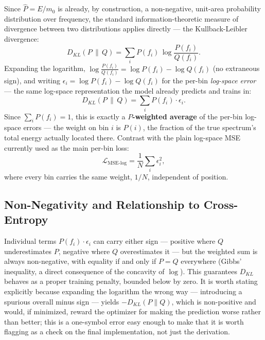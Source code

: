 \documentclass[11pt,a4paper]{article}
\begin{document}
Since $\hat P = E/m_0$ is already, by construction, a non-negative,
unit-area probability distribution over frequency, the standard
information-theoretic measure of divergence between two distributions
applies directly — the Kullback-Leibler divergence:
\begin{equation}
D_{KL}(P\,\|\,Q) = \sum_i P(f_i)\,\log\frac{P(f_i)}{Q(f_i)}.
\end{equation}
Expanding the logarithm, $\log\frac{P(f_i)}{Q(f_i)} = \log P(f_i) - \log
Q(f_i)$ (no extraneous sign), and writing $\epsilon_i = \log P(f_i) - \log
Q(f_i)$ for the per-bin \emph{log-space error} — the same log-space
representation the model already predicts and trains in:
\begin{equation}
D_{KL}(P\,\|\,Q) = \sum_i P(f_i)\cdot \epsilon_i.
\end{equation}
Since $\sum_i P(f_i) = 1$, this is exactly a \textbf{$P$-weighted average}
of the per-bin log-space errors — the weight on bin $i$ is $P(i)$, the
fraction of the true spectrum's total energy actually located there.
Contrast with the plain log-space MSE currently used as the main per-bin
loss:
\begin{equation}
\mathcal{L}_{\text{MSE-log}} = \frac{1}{N}\sum_i \epsilon_i^2,
\end{equation}
where every bin carries the same weight, $1/N$, independent of position.

\subsection{Non-Negativity and Relationship to Cross-Entropy}

Individual terms $P(f_i)\cdot\epsilon_i$ can carry either sign — positive
where $Q$ underestimates $P$, negative where $Q$ overestimates it — but the
weighted sum is always non-negative, with equality if and only if $P=Q$
everywhere (Gibbs' inequality, a direct consequence of the concavity of
$\log$). This guarantees $D_{KL}$ behaves as a proper training penalty,
bounded below by zero. It is worth stating explicitly because expanding the
logarithm the wrong way — introducing a spurious overall minus sign — yields
$-D_{KL}(P\|Q)$, which is non-positive and would, if minimized, reward the
optimizer for making the prediction worse rather than better; this is a
one-symbol error easy enough to make that it is worth flagging as a check
on the final implementation, not just the derivation.
\end{document}
